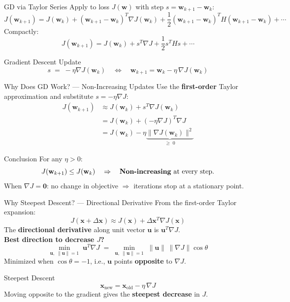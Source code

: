 \documentclass{beamer}
\begin{document}
\begin{frame}{GD via Taylor Series}
  Apply to loss $J(\mathbf{w})$ with step $s = \mathbf{w}_{k+1} - \mathbf{w}_k$:
  \[
    J(\mathbf{w}_{k+1})
    = J(\mathbf{w}_k) + (\mathbf{w}_{k+1}-\mathbf{w}_k)^T\nabla J(\mathbf{w}_k)
    + \frac{1}{2}(\mathbf{w}_{k+1}-\mathbf{w}_k)^T H (\mathbf{w}_{k+1}-\mathbf{w}_k) + \cdots
  \]
  Compactly:
  \[
    J(\mathbf{w}_{k+1}) = J(\mathbf{w}_k) + s^T\nabla J + \frac{1}{2}s^T H s + \cdots
  \]
  \begin{block}{Gradient Descent Update}
    \[
      s \;=\; -\eta\nabla J(\mathbf{w}_k)
      \quad\Longleftrightarrow\quad
      \mathbf{w}_{k+1} = \mathbf{w}_k - \eta\,\nabla J(\mathbf{w}_k)
    \]
  \end{block}
\end{frame}

\begin{frame}{Why Does GD Work? --- Non-Increasing Updates}
  Use the \textbf{first-order} Taylor approximation and substitute $s = -\eta\nabla J$:
  \begin{align*}
    J(\mathbf{w}_{k+1}) &\approx J(\mathbf{w}_k) + s^T\nabla J(\mathbf{w}_k) \\[4pt]
                         &= J(\mathbf{w}_k) + (-\eta\nabla J)^T \nabla J \\[4pt]
                         &= J(\mathbf{w}_k) - \eta\underbrace{\|\nabla J(\mathbf{w}_k)\|^2}_{\geq\;0}
  \end{align*}
  \begin{block}{Conclusion}
    For any $\eta > 0$:
    \[
      J(\mathbf{w}_{k+1}) \leq J(\mathbf{w}_k)
      \quad\Rightarrow\quad \text{\textbf{Non-increasing} at every step.}
    \]
    When $\nabla J = \mathbf{0}$: no change in objective $\Rightarrow$ iterations stop at a stationary point.
  \end{block}
\end{frame}

\begin{frame}{Why Steepest Descent? --- Directional Derivative}
  From the first-order Taylor expansion:
  \[
    J(\mathbf{x}+\Delta\mathbf{x}) \approx J(\mathbf{x}) + \Delta\mathbf{x}^T\nabla J(\mathbf{x})
  \]
  The \textbf{directional derivative} along unit vector $\mathbf{u}$ is $\mathbf{u}^T\nabla J$.\\[6pt]
  \textbf{Best direction to decrease $J$?}
  \[
    \min_{\mathbf{u},\;\|\mathbf{u}\|=1}\; \mathbf{u}^T\nabla J
    \;=\; \min_{\mathbf{u},\;\|\mathbf{u}\|=1}\;\|\mathbf{u}\|\,\|\nabla J\|\cos\theta
  \]
  Minimized when $\cos\theta = -1$, i.e., $\mathbf{u}$ points \textbf{opposite} to $\nabla J$.
  \begin{block}{Steepest Descent}
    \[
      \mathbf{x}_{\text{new}} = \mathbf{x}_{\text{old}} - \eta\,\nabla J
    \]
    Moving opposite to the gradient gives the \textbf{steepest decrease} in $J$.
  \end{block}
\end{frame}
\end{document}
